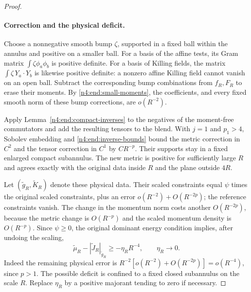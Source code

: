 \begin{proof}
\paragraph{Correction and the physical deficit.}
Choose a nonnegative smooth bump \(\zeta\), supported in a fixed ball
within the annulus and positive on a smaller ball. For a basis of the
affine tests, its Gram matrix
\(\int\zeta\phi_a\phi_b\) is positive definite. For a basis of
Killing fields, the matrix \(\int\zeta\,Y_a\cdot Y_b\) is likewise
positive definite: a nonzero affine Killing field cannot vanish on an
open ball. Subtract the corresponding bump combinations from
\(f_R,F_R\) to erase their moments. By \eqref{n4:end:small-moments},
the coefficients, and every fixed smooth norm of these bump corrections,
are \(o(R^{-2})\).

Apply Lemma~\ref{n4:end:compact-inverses} to the negatives of the
moment-free commutators and add the resulting tensors to the blend.
With \(j=1\) and \(p_1>4\), Sobolev embedding and
\eqref{n4:end:inverse-bounds} bound the metric correction in \(C^2\)
and the tensor correction in \(C^1\) by \(CR^{-p}\).
Their supports stay in a fixed enlarged compact subannulus.
The new metric is positive for sufficiently large \(R\) and agrees
exactly with the original data inside \(R\) and the plane outside
\(4R\).

Let \((\widetilde g_R,\widetilde K_R)\) denote these physical data.
Their scaled constraints equal \(\psi\) times the original scaled
constraints, plus an error
\(o(R^{-2})+O(R^{-2p})\); the reference constraints vanish.
The change in the momentum norm costs another \(O(R^{-2p})\), because
the metric change is \(O(R^{-p})\) and the scaled momentum density is
\(O(R^{-p})\). Since \(\psi\ge0\), the original dominant energy
condition implies, after undoing the scaling,
\begin{equation}\label{n4:end:physical-deficit}
 \widetilde\mu_R-|\widetilde J_R|_{\widetilde g_R}
       \ge-\eta_RR^{-4},\qquad \eta_R\longrightarrow0.
\end{equation}
Indeed the remaining physical error is
\(R^{-2}[o(R^{-2})+O(R^{-2p})]=o(R^{-4})\), since \(p>1\).
The possible deficit is confined to a fixed closed subannulus on the
scale \(R\). Replace \(\eta_R\) by a positive majorant tending to zero
if necessary.


\end{proof}
